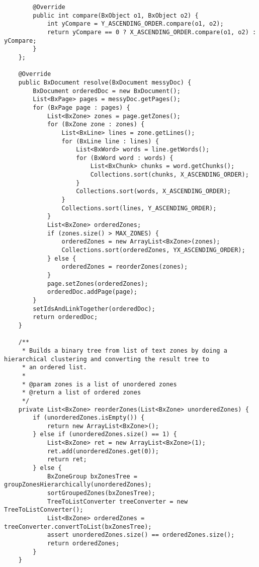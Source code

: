 \begin{appendix}
\begin{lstlisting}
        @Override
        public int compare(BxObject o1, BxObject o2) {
            int yCompare = Y_ASCENDING_ORDER.compare(o1, o2);
            return yCompare == 0 ? X_ASCENDING_ORDER.compare(o1, o2) : yCompare;
        }
    };

    @Override
    public BxDocument resolve(BxDocument messyDoc) {
        BxDocument orderedDoc = new BxDocument();
        List<BxPage> pages = messyDoc.getPages();
        for (BxPage page : pages) {
            List<BxZone> zones = page.getZones();
            for (BxZone zone : zones) {
                List<BxLine> lines = zone.getLines();
                for (BxLine line : lines) {
                    List<BxWord> words = line.getWords();
                    for (BxWord word : words) {
                        List<BxChunk> chunks = word.getChunks();
                        Collections.sort(chunks, X_ASCENDING_ORDER);
                    }
                    Collections.sort(words, X_ASCENDING_ORDER);
                }
                Collections.sort(lines, Y_ASCENDING_ORDER);
            }
            List<BxZone> orderedZones;
            if (zones.size() > MAX_ZONES) {
                orderedZones = new ArrayList<BxZone>(zones);
                Collections.sort(orderedZones, YX_ASCENDING_ORDER);
            } else {
                orderedZones = reorderZones(zones);
            }
            page.setZones(orderedZones);
            orderedDoc.addPage(page);
        }
        setIdsAndLinkTogether(orderedDoc);
        return orderedDoc;
    }

    /**
     * Builds a binary tree from list of text zones by doing a hierarchical clustering and converting the result tree to
     * an ordered list.
     *
     * @param zones is a list of unordered zones
     * @return a list of ordered zones
     */
    private List<BxZone> reorderZones(List<BxZone> unorderedZones) {
        if (unorderedZones.isEmpty()) {
            return new ArrayList<BxZone>();
        } else if (unorderedZones.size() == 1) {
            List<BxZone> ret = new ArrayList<BxZone>(1);
            ret.add(unorderedZones.get(0));
            return ret;
        } else {
            BxZoneGroup bxZonesTree = groupZonesHierarchically(unorderedZones);
            sortGroupedZones(bxZonesTree);
            TreeToListConverter treeConverter = new TreeToListConverter();
            List<BxZone> orderedZones = treeConverter.convertToList(bxZonesTree);
            assert unorderedZones.size() == orderedZones.size();
            return orderedZones;
        }
    }


\end{lstlisting}
\end{appendix}
